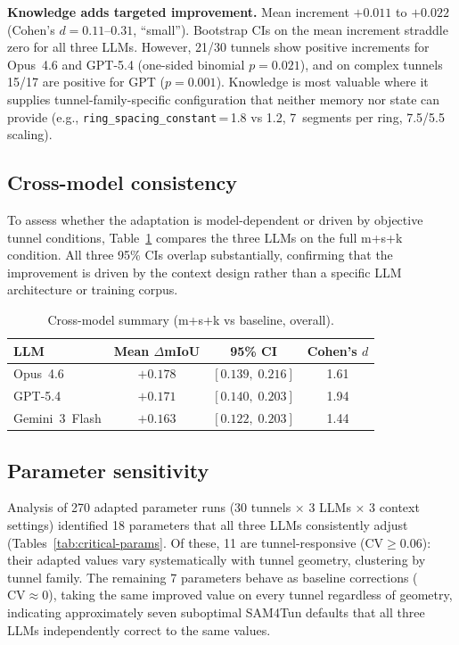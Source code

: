 \documentclass[a4paper,fleqn]{cas-dc}
\begin{document}
\textbf{Knowledge adds targeted improvement.} Mean increment $+0.011$ to $+0.022$ (Cohen's $d = 0.11$--$0.31$, ``small''). Bootstrap CIs on the mean increment straddle zero for all three LLMs. However, 21/30 tunnels show positive increments for Opus~4.6 and GPT-5.4 (one-sided binomial $p = 0.021$), and on complex tunnels 15/17 are positive for GPT ($p = 0.001$). Knowledge is most valuable where it supplies tunnel-family-specific configuration that neither memory nor state can provide (e.g., \texttt{ring\_spacing\_constant}\,=\,1.8 vs 1.2, 7~segments per ring, 7.5/5.5 scaling).

\subsection{Cross-model consistency}\label{sec:consistency}

To assess whether the adaptation is model-dependent or driven by objective tunnel conditions, Table~\ref{tab:cross-model} compares the three LLMs on the full m+s+k condition. All three 95\% CIs overlap substantially, confirming that the improvement is driven by the context design rather than a specific LLM architecture or training corpus.

\begin{table}[ht]
\caption{Cross-model summary (m+s+k vs baseline, overall).}\label{tab:cross-model}
\begin{tabular*}{\tblwidth}{@{} l c c c @{}}
\toprule
LLM & Mean $\Delta$mIoU & 95\% CI & Cohen's $d$ \\
\midrule
Opus~4.6 & $+0.178$ & $[0.139,\; 0.216]$ & 1.61 \\
GPT-5.4 & $+0.171$ & $[0.140,\; 0.203]$ & 1.94 \\
Gemini~3~Flash & $+0.163$ & $[0.122,\; 0.203]$ & 1.44 \\
\bottomrule
\end{tabular*}
\end{table}

\subsection{Parameter sensitivity}\label{sec:sensitivity}


Analysis of 270 adapted parameter runs  (30 tunnels × 3 LLMs × 3 context settings) identified 18 parameters that all three LLMs consistently adjust (Tables~\ref{tab:critical-params}. Of these, 11 are tunnel-responsive ($\text{CV} \geq 0.06$): their adapted values vary systematically with tunnel geometry, clustering by tunnel family. The remaining 7 parameters behave as baseline corrections ($\text{CV} \approx 0$), taking the same improved value on every tunnel regardless of geometry, indicating approximately seven suboptimal SAM4Tun defaults that all three LLMs independently correct to the same values.
\end{document}
